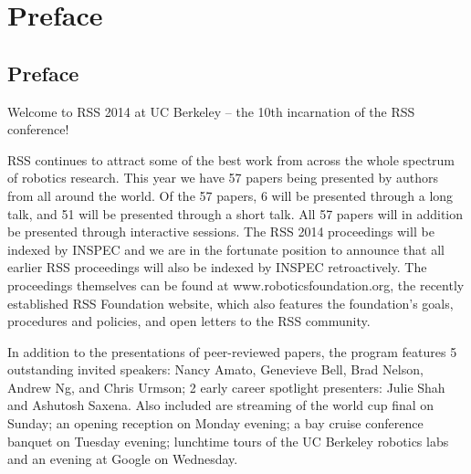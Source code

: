 
\chapter*{Preface}


                                                                     
                                             
\vspace{3cm}
\section*{Preface}
\begingroup{}
\Large
\vspace{1cm}

Welcome to RSS 2014 at UC Berkeley – the 10th incarnation of the RSS conference! 

\vspace{1mm}

RSS continues to attract some of the best work from across the whole spectrum of robotics research.  This year we have 57 papers being presented by authors from all around the world. Of the 57 papers, 6 will be presented through a long talk, and 51 will be presented through a short talk.  All 57 papers will in addition be presented through interactive sessions.   The RSS 2014 proceedings will be indexed by INSPEC and we are in the fortunate position to announce that all earlier RSS proceedings will also be indexed by INSPEC retroactively.  The proceedings themselves can be found at www.roboticsfoundation.org, the recently established RSS Foundation website, which also features the foundation’s goals, procedures and policies, and open letters to the RSS community.

\vspace{1mm}

In addition to the presentations of peer-reviewed papers, the program features 5 outstanding invited speakers: Nancy Amato, Genevieve Bell, Brad Nelson, Andrew Ng, and Chris Urmson; 2 early career spotlight presenters: Julie Shah and Ashutosh Saxena.  Also included are streaming of the world cup final on Sunday; an opening reception on Monday evening; a bay cruise conference banquet on Tuesday evening; lunchtime tours of the UC Berkeley robotics labs and an evening at Google on Wednesday.

\vspace{1mm}

